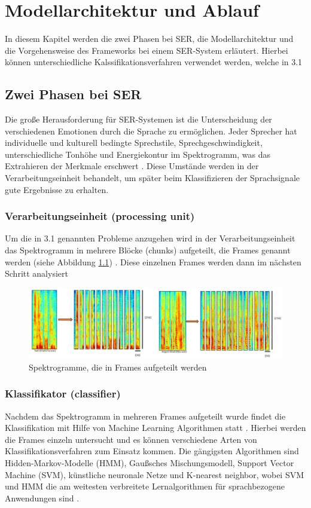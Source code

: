 \chapter{Modellarchitektur und Ablauf}

In diesem Kapitel werden die zwei Phasen bei SER, die Modellarchitektur und die Vorgehensweise des Frameworks bei einem SER-System erläutert. Hierbei können unterschiedliche Kalssifikationsverfahren verwendet werden, welche in 3.1  


\section{Zwei Phasen bei SER}

Die große Herausforderung für SER-Systemen ist die Unterscheidung der verschiedenen Emotionen durch die Sprache zu ermöglichen. Jeder Sprecher hat individuelle und kulturell bedingte Sprechstile, Sprechgeschwindigkeit, unterschiedliche Tonhöhe und Energiekontur im Spektrogramm, was das Extrahieren der Merkmale erschwert \cite{badshah2019deep}. Diese Umstände werden in der Verarbeitungseinheit behandelt, um später beim Klassifizieren der Sprachsignale gute Ergebnisse zu erhalten. 
\subsection{Verarbeitungseinheit (processing unit)}
Um die in 3.1 genannten Probleme anzugehen wird in der Verarbeitungseinheit das Spektrogramm in mehrere Blöcke (chunks) aufgeteilt, die Frames genannt werden (siehe Abbildung \ref{frames}) \cite{badshah2019deep}. Diese einzelnen Frames werden dann im nächsten Schritt analysiert 
\begin{figure}[ht]
	\centering
	\includegraphics[width=1\textwidth]{images/frames}
	\caption{\label{frames}Spektrogramme, die in Frames aufgeteilt werden \cite{badshah2019deep}}
\end{figure}
\subsection{Klassifikator (classifier)}
Nachdem das Spektrogramm in mehreren Frames aufgeteilt wurde findet die Klassifikation mit Hilfe von Machine Learning Algorithmen statt \cite{badshah2019deep}. Hierbei werden die Frames einzeln untersucht und es können verschiedene Arten von Klassifikationsverfahren zum Einsatz kommen. Die gängigsten Algorithmen sind Hidden-Markov-Modelle (HMM), Gaußsches Mischungsmodell, Support Vector Machine (SVM), künstliche neuronale Netze und K-nearest neighbor, wobei SVM und HMM die am weitesten verbreitete Lernalgorithmen für sprachbezogene Anwendungen sind \cite{badshah2019deep}.

